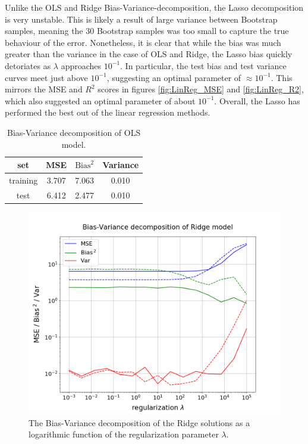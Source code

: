 \documentclass[nofootinbib,reprint,english]{revtex4-1}
\begin{document}
Unlike the OLS and Ridge Bias-Variance-decomposition, the Lasso decomposition is very unstable. This is likely a result of large variance between Bootstrap samples, meaning the 30 Bootstrap samples was too small to capture the true behaviour of the error. Nonetheless, it is clear that while the bias was much greater than the variance in the case of OLS and Ridge, the Lasso bias quickly detoriates as \(\lambda\) approaches \(10^{-1}\). In particular, the test bias and test variance curves meet just above \(10^{-1}\), suggesting an optimal parameter of \(\approx10^{-1}\). This mirrors the MSE and \(R^2\) scores in figures \ref{fig:LinReg_MSE} and \ref{fig:LinReg_R2}, which also suggested an optimal parameter of about \(10^{-1}\). Overall, the Lasso has performed the best out of the linear regression methods.

\begin{table}[ht]
\centering
\caption{Bias-Variance decomposition of OLS model.}\label{tab:bias_var_decomp_OLS}
\begin{tabular}{|c|c|c|c|}
\hline
\rule{0pt}{10pt}
set      & MSE   & \(\text{Bias}^2\) & Variance \\\hline
training & 3.707 & 7.063             & 0.010    \\\hline
test     & 6.412 & 2.477             & 0.010    \\
\hline
\end{tabular}
\end{table}

\begin{figure}[hb]
\centering
\includegraphics[scale=0.3]{../output/LinReg/BiasVarDecomp_Ridge_loglog.png}
\caption{The Bias-Variance decomposition of the Ridge solutions as a logarithmic function of the regularization parameter \(\lambda\).}\label{fig:LinReg_BiasVarDecomp_Ridge}
\end{figure}
\end{document}
